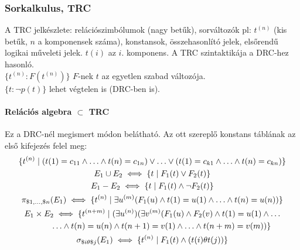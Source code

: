 \documentclass[fleqn,10pt,a4paper]{article}
\theoremstyle{magyar}
\begin{document}
  \subsubsection{Sorkalkulus, TRC}
  A TRC jelkészlete: relációszimbólumok (nagy betűk), sorváltozók pl: $t^{(n)}$ (kis betűk, $n$ a komponensek száma),
  konstansok, összehasonlító jelek, elsőrendű logikai műveleti jelek. $t(i)$ az $i$. komponens.
  A TRC szintaktikája a DRC-hez hasonló.\\  
  $\{ t^{(n)} : F(t^{(n)})\}$ $F$-nek $t$ az egyetlen szabad változója.\\
  $\{ t : \lnot p(t) \}$ lehet végtelen is (DRC-ben is).
  
  \paragraph{Relációs algebra $\subset$ TRC} Ez a DRC-nél megismert módon belátható. Az ott szereplő konstans táblának
  az első kifejezés felel meg: 
  \begin{gather*}
    \{t^{(n)} \mid (t(1) = c_{11} \land \ldots \land t(n) = c_{1n}) \lor \ldots \lor (t(1)  =
    c_{k1} \land\ldots\land t(n)=c_{kn}) \}\\
    E_1 \cup E_2 \iff \{ t \mid F_1(t) \lor F_2(t) \}\\
    E_1 - E_2 \iff \{ t \mid F_1(t) \land \lnot F_2(t) \}\\
    \pi_{\$1,\ldots,\$n}(E_1) \iff \{ t^{(n)} \mid \exists u^{(m)} (F_1(u) \land t(1) = u(1) \land \ldots \land t(n) = u(n)) \}\\
    E_1\times E_2 \iff \{ t^{(n+m)} \mid (\exists u^{(n)})(\exists v^{(m)}(F_1(u)\land F_2(v) \land t(1) = u(1)\land
    \ldots \\\hspace*{0.8cm}\ldots\land t(n) = u(n) \land t(n+1) = v(1) \land \ldots \land t(n+m) = v(m)) \}\\
    \sigma_{\$i \theta \$j}(E_1) \iff \{ t^{(n)} \mid F_1(t) \land (t(i) \theta t(j))\}
  \end{gather*}
\end{document}
